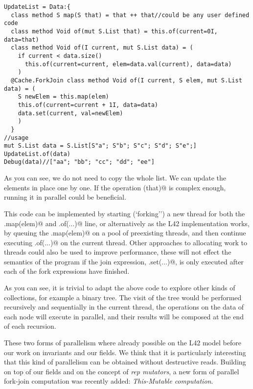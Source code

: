 \begin{lstlisting}[deletekeywords=label]
UpdateList = Data:{
  class method S map(S that) = that ++ that//could be any user defined code
  class method Void of(mut S.List that) = this.of(current=0I, data=that)  
  class method Void of(I current, mut S.List data) = (
    if current < data.size() 
      this.of(current=current, elem=data.val(current), data=data)
    )
  @Cache.ForkJoin class method Void of(I current, S elem, mut S.List data) = (
    S newElem = this.map(elem)
    this.of(current=current + 1I, data=data)
    data.set(current, val=newElem)
    )
  }
//usage
mut S.List data = S.List[S"a"; S"b"; S"c"; S"d"; S"e";]
UpdateList.of(data)
Debug(data)//["aa"; "bb"; "cc"; "dd"; "ee"]
\end{lstlisting}
As you can see, we do not need to copy the whole list. We can update the elements in place one by one.
If the operation \Q@map(that)@ is complex enough, running it in parallel could be beneficial.

This code can be implemented by starting (`forking'') a new thread for both the \Q@this.map(elem)@ and \Q@this.of(...)@ line, or alternatively as the L42 implementation works, by queuing the \Q@this.map(elem)@ on a pool of preexisting threads, and then continue executing \Q@this.of(...)@ on the current thread.
Other approaches to allocating work to threads could also be used to improve performance, these will not effect the semantics of the program if the join expression, \Q@data.set(...)@, is only executed after each of the fork expressions have finished.

As you can see, it is trivial to adapt the above code to explore other kinds of collections, for example a binary tree.
The visit of the tree would be performed recursively and sequentially in the current thread, the operations on the data of each node will execute in parallel, and their results will be composed at the end of each recursion.

These two forms of parallelism where already possible on the L42 model before our work on invariants and our \Q@rep@ fields.
We think that it is particularly interesting that this kind of parallelism can be obtained without destructive reads.
Building on top of our \Q@rep@ fields and on the concept of \emph{rep mutators}, a new form of parallel fork-join computation was recently added:
\emph{This-Mutable computation}.

